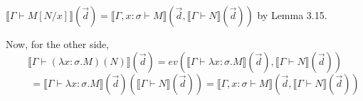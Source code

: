 $ \llbracket \Gamma \vdash M[N/x] \rrbracket (\vec{d}) = \llbracket \Gamma , x: \sigma \vdash M \rrbracket (\vec{d}, \llbracket \Gamma \vdash N \rrbracket (\vec{d})) $ by Lemma 3.15.

Now, for the other side, 
$$  \llbracket \Gamma \vdash (\lambda x : \sigma . M)(N) \rrbracket (\vec{d}) = ev(\llbracket \Gamma \vdash \lambda x:\sigma . M \rrbracket (\vec{d}), \llbracket \Gamma \vdash N \rrbracket (\vec{d}))  $$
$$ \qquad = \llbracket \Gamma \vdash \lambda x:\sigma . M \rrbracket (\vec{d})(\llbracket \Gamma \vdash N \rrbracket (\vec{d})) = \llbracket \Gamma , x:\sigma \vdash M \rrbracket ( \vec{d} , \llbracket \Gamma \vdash N \rrbracket (\vec{d})) $$
